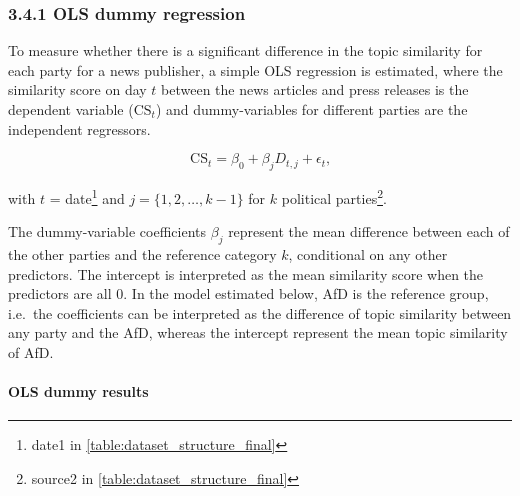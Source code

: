 \documentclass[
  12pt,
]{article}
\begin{document}
\hypertarget{ols-dummy-regression}{%
\subsubsection{3.4.1 OLS dummy regression}\label{ols-dummy-regression}}

To measure whether there is a significant difference in the topic
similarity for each party for a news publisher, a simple OLS regression
is estimated, where the similarity score on day \(t\) between the news
articles and press releases is the dependent variable
(\(\text{CS}_{t}\)) and dummy-variables for different parties are the
independent regressors.

\[
\text{CS}_{t}=\beta_0+\beta_jD_{t,j}+\epsilon_t\text{,}
\]

with \(t\) = date\footnote{date1 in
  \autoref{table:dataset_structure_final}} and \(j=\{1,2,\dots,k-1\}\)
for \(k\) political parties\footnote{source2 in
  \autoref{table:dataset_structure_final}}.

The dummy-variable coefficients \(\beta_{j}\) represent the mean
difference between each of the other parties and the reference category
\(k\), conditional on any other predictors. The intercept is interpreted
as the mean similarity score when the predictors are all 0. In the model
estimated below, AfD is the reference group, i.e.~the coefficients can
be interpreted as the difference of topic similarity between any party
and the AfD, whereas the intercept represent the mean topic similarity
of AfD.

\hypertarget{ols-dummy-results}{%
\paragraph{OLS dummy results}\label{ols-dummy-results}}
\end{document}
